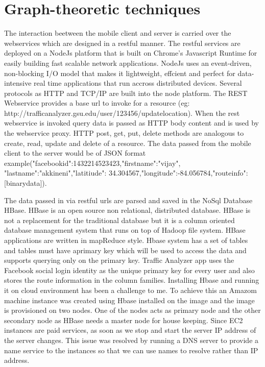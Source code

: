 \documentclass[10pt]{sigplan-proc-varsize}
\begin{document}
\section{Graph-theoretic techniques}

 The interaction beetween the mobile client and server is carried over the webservices which are designed in a restful manner.  The restful services are deployed on a NodeJs platform that is built on Chrome's Javascript Runtime for easily building fast scalable network applications. NodeJs uses an event-driven, non-blocking I/O model that makes it lightweight, effcient and perfect for data-intensive real time applications that run accross distributed devices. Several protocols as HTTP and TCP/IP are built into the node platform. The REST Webservice provides a base url to invoke for a resource (eg: http://trafficanalyzer.gsu.edu/user/123456/updatelocation). When the rest webservice is invoked query data is passed as HTTP body content and is used by the webservice proxy. HTTP post, get, put, delete methods are analogous to create, read, update and delete of a resource. The data passed from the mobile client to the server would be of JSON format example({"facebookid":1432214523423,"firstname":"vijay",
"lastname":"akkineni","latitiude": 34.304567,"longitude":-84.056784,"routeinfo":[binarydata]}).
 
The data passed in via restful urls are parsed and saved in the NoSql Database HBase.  HBase is an open source non relational, distributed database. HBase is not a replacement for the traditional database but it is a column oriented database management system that runs on top of Hadoop file system. HBase applications are written in mapReduce style. Hbase system has a set of tables and tables must have aprimary key which will be used to access the data and supports querying only on the primary key.  Traffic Analyzer app uses the Facebook social login identity as the unique primary key for every user and also stores the route information in the column families. Installing Hbase and running it on cloud environment has been a challenge to me. To achieve this an Amazom machine instance was created using Hbase installed on the image and the image is provisioned on two nodes. One of the nodes acts as primary node and the other secondary node as HBase needs a master node for house keeping. Since EC2 instances are paid services, as soon as we stop and start the server IP address of the server changes. This issue was resolved by running a DNS server to provide a name service to the instances so that we can use names to resolve rather than IP address. 
\end{document}
